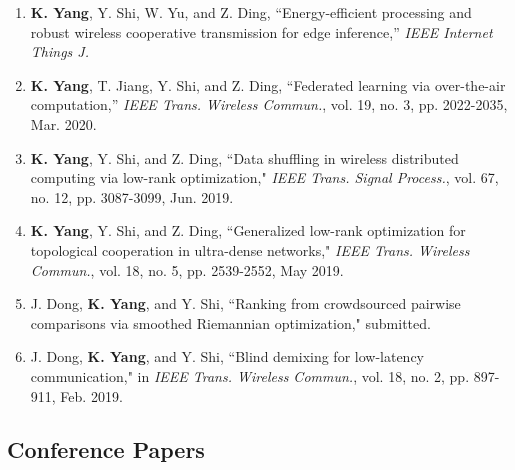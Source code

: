 \documentclass{article}
\begin{document}
\begin{enumerate}
\item {\bf{K. Yang}}, Y. Shi, W. Yu, and Z. Ding, ``Energy-efficient processing and robust wireless cooperative transmission for edge inference,'' \emph{IEEE Internet Things J.}
\item {\bf{K. Yang}}, T. Jiang, Y. Shi, and Z. Ding, ``Federated learning via over-the-air computation,'' \emph{IEEE Trans. Wireless Commun.}, vol. 19, no. 3, pp. 2022-2035, Mar. 2020.
\item {\bf{K. Yang}}, Y. Shi, and Z. Ding, ``Data shuffling in wireless distributed computing via low-rank optimization," \emph{IEEE Trans. Signal Process.}, vol. 67, no. 12, pp. 3087-3099, Jun. 2019.
\item {\bf{K. Yang}}, Y. Shi, and Z. Ding, ``Generalized
low-rank optimization for topological cooperation in ultra-dense networks," \emph{IEEE Trans. Wireless Commun.}, vol. 18, no. 5, pp. 2539-2552, May 2019.
\item {{J. Dong}}, {\bf{K. Yang}}, and Y. Shi, ``Ranking from crowdsourced pairwise comparisons via smoothed Riemannian optimization," submitted.
\item J. Dong, {\bf{K. Yang}}, and Y. Shi, ``Blind demixing for low-latency communication," in \emph{IEEE
Trans. Wireless Commun.}, vol. 18, no. 2, pp. 897-911, Feb. 2019.
\end{enumerate}

\subsection*{Conference Papers}
\end{document}
